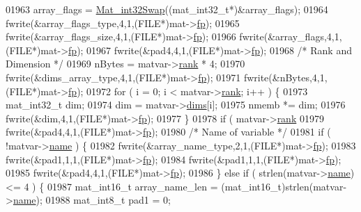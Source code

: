 \begin{DoxyCode}
{{{{{{{{{{{{{{{{01963         array\_flags = \hyperlink{endian_8c_a2e0153996243f0a34df9a5286087cfa3}{Mat\_int32Swap}((mat\_int32\_t*)&array\_flags);
01964     fwrite(&array\_flags\_type,4,1,(FILE*)mat->\hyperlink{struct__mat__t_a85f562e407ca9ad4d2a6e14f839432b7}{fp});
01965     fwrite(&array\_flags\_size,4,1,(FILE*)mat->\hyperlink{struct__mat__t_a85f562e407ca9ad4d2a6e14f839432b7}{fp});
01966     fwrite(&array\_flags,4,1,(FILE*)mat->\hyperlink{struct__mat__t_a85f562e407ca9ad4d2a6e14f839432b7}{fp});
01967     fwrite(&pad4,4,1,(FILE*)mat->\hyperlink{struct__mat__t_a85f562e407ca9ad4d2a6e14f839432b7}{fp});
01968     \textcolor{comment}{/* Rank and Dimension */}
01969     nBytes = matvar->\hyperlink{group___m_a_t_a84ba70c96ded13cc555fa75b768d9921}{rank} * 4;
01970     fwrite(&dims\_array\_type,4,1,(FILE*)mat->\hyperlink{struct__mat__t_a85f562e407ca9ad4d2a6e14f839432b7}{fp});
01971     fwrite(&nBytes,4,1,(FILE*)mat->\hyperlink{struct__mat__t_a85f562e407ca9ad4d2a6e14f839432b7}{fp});
01972     \textcolor{keywordflow}{for} ( i = 0; i < matvar->\hyperlink{group___m_a_t_a84ba70c96ded13cc555fa75b768d9921}{rank}; i++ ) \{
01973         mat\_int32\_t dim;
01974         dim = matvar->\hyperlink{group___m_a_t_a8e01234e1c862ce3472bb37f5a09b92c}{dims}[i];
01975         nmemb *= dim;
01976         fwrite(&dim,4,1,(FILE*)mat->\hyperlink{struct__mat__t_a85f562e407ca9ad4d2a6e14f839432b7}{fp});
01977     \}
01978     \textcolor{keywordflow}{if} ( matvar->\hyperlink{group___m_a_t_a84ba70c96ded13cc555fa75b768d9921}{rank} %
01979         fwrite(&pad4,4,1,(FILE*)mat->\hyperlink{struct__mat__t_a85f562e407ca9ad4d2a6e14f839432b7}{fp});
01980     \textcolor{comment}{/* Name of variable */}
01981     \textcolor{keywordflow}{if} ( !matvar->\hyperlink{group___m_a_t_a5d4b55b041e3b4fb50c04337f05ad909}{name} ) \{
01982         fwrite(&array\_name\_type,2,1,(FILE*)mat->\hyperlink{struct__mat__t_a85f562e407ca9ad4d2a6e14f839432b7}{fp});
01983         fwrite(&pad1,1,1,(FILE*)mat->\hyperlink{struct__mat__t_a85f562e407ca9ad4d2a6e14f839432b7}{fp});
01984         fwrite(&pad1,1,1,(FILE*)mat->\hyperlink{struct__mat__t_a85f562e407ca9ad4d2a6e14f839432b7}{fp});
01985         fwrite(&pad4,4,1,(FILE*)mat->\hyperlink{struct__mat__t_a85f562e407ca9ad4d2a6e14f839432b7}{fp});
01986     \} \textcolor{keywordflow}{else} \textcolor{keywordflow}{if} ( strlen(matvar->\hyperlink{group___m_a_t_a5d4b55b041e3b4fb50c04337f05ad909}{name}) <= 4 ) \{
01987         mat\_int16\_t array\_name\_len = (mat\_int16\_t)strlen(matvar->\hyperlink{group___m_a_t_a5d4b55b041e3b4fb50c04337f05ad909}{name});
01988         mat\_int8\_t  pad1 = 0;
}}}}}}}}}}}}}}}}
\end{DoxyCode}
